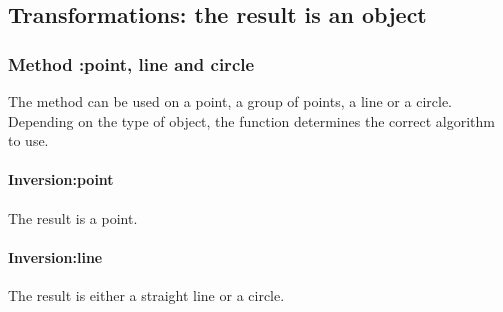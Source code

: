 



\subsection{Transformations: the result is an object} %

\subsubsection{Method :point, line and circle} %
\label{ssub:inversion}

The  method can be used on a point, a group of points, a line or a circle. Depending on the type of object, the function determines the correct algorithm to use.


\paragraph{Inversion:point} %
\label{par:inversion_point}

The result is a point.

\begin{tkzexample}[latex=.5\textwidth]

\begin{center}
\end{center}
\end{tkzexample}

\paragraph{Inversion:line} %
\label{par:inversion_line}

The result is either a straight line or a circle.

